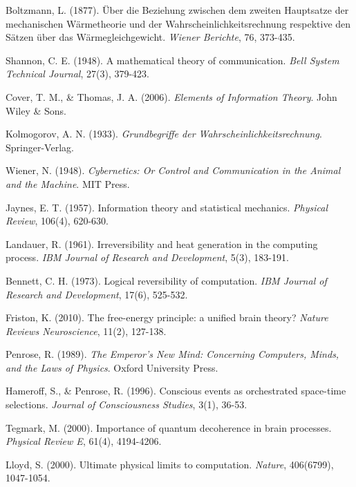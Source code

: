 \documentclass[12pt,a4paper]{article}
\begin{document}

\begin{thebibliography}{99}

Boltzmann, L. (1877). Über die Beziehung zwischen dem zweiten Hauptsatze der mechanischen Wärmetheorie und der Wahrscheinlichkeitsrechnung respektive den Sätzen über das Wärmegleichgewicht. \textit{Wiener Berichte}, 76, 373-435.

Shannon, C. E. (1948). A mathematical theory of communication. \textit{Bell System Technical Journal}, 27(3), 379-423.

Cover, T. M., \& Thomas, J. A. (2006). \textit{Elements of Information Theory}. John Wiley \& Sons.

Kolmogorov, A. N. (1933). \textit{Grundbegriffe der Wahrscheinlichkeitsrechnung}. Springer-Verlag.

Wiener, N. (1948). \textit{Cybernetics: Or Control and Communication in the Animal and the Machine}. MIT Press.

Jaynes, E. T. (1957). Information theory and statistical mechanics. \textit{Physical Review}, 106(4), 620-630.

Landauer, R. (1961). Irreversibility and heat generation in the computing process. \textit{IBM Journal of Research and Development}, 5(3), 183-191.

Bennett, C. H. (1973). Logical reversibility of computation. \textit{IBM Journal of Research and Development}, 17(6), 525-532.

Friston, K. (2010). The free-energy principle: a unified brain theory? \textit{Nature Reviews Neuroscience}, 11(2), 127-138.

Penrose, R. (1989). \textit{The Emperor's New Mind: Concerning Computers, Minds, and the Laws of Physics}. Oxford University Press.

Hameroff, S., \& Penrose, R. (1996). Conscious events as orchestrated space-time selections. \textit{Journal of Consciousness Studies}, 3(1), 36-53.

Tegmark, M. (2000). Importance of quantum decoherence in brain processes. \textit{Physical Review E}, 61(4), 4194-4206.

Lloyd, S. (2000). Ultimate physical limits to computation. \textit{Nature}, 406(6799), 1047-1054.


\end{thebibliography}
\end{document}
